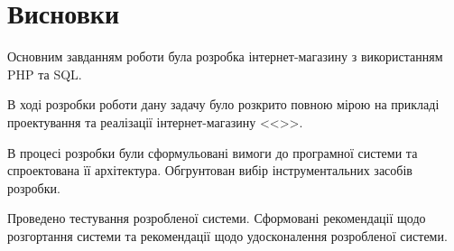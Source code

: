 \section*{Висновки}
Основним завданням роботи була розробка інтернет-магазину з використанням PHP та SQL.

В ході розробки роботи дану задачу було розкрито повною мірою на прикладі проектування та реалізації інтернет-магазину <<\thesitename>>.

В процесі розробки були сформульовані вимоги до програмної системи та спроектована її архітектура. 
Обгрунтован вибір інструментальних засобів розробки.

Проведено тестування розробленої системи.
Сформовані рекомендації щодо розгортання системи та рекомендації щодо удосконалення розробленої системи. 
